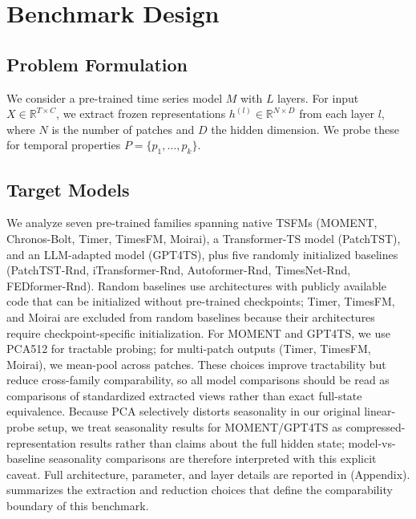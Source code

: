 \documentclass{article}
\begin{document}
\section{Benchmark Design}

\subsection{Problem Formulation}

We consider a pre-trained time series model $M$ with $L$ layers. For input $X \in \mathbb{R}^{T \times C}$, we extract frozen representations $h^{(l)} \in \mathbb{R}^{N \times D}$ from each layer $l$, where $N$ is the number of patches and $D$ the hidden dimension. We probe these for temporal properties $P = \{p_1, \dots, p_k\}$.

\subsection{Target Models}

We analyze seven pre-trained families spanning native TSFMs (MOMENT, Chronos-Bolt, Timer, TimesFM, Moirai), a Transformer-TS model (PatchTST), and an LLM-adapted model (GPT4TS), plus five randomly initialized baselines (PatchTST-Rnd, iTransformer-Rnd, Autoformer-Rnd, TimesNet-Rnd, FEDformer-Rnd). Random baselines use architectures with publicly available code that can be initialized without pre-trained checkpoints; Timer, TimesFM, and Moirai are excluded from random baselines because their architectures require checkpoint-specific initialization. For MOMENT and GPT4TS, we use PCA512 for tractable probing; for multi-patch outputs (Timer, TimesFM, Moirai), we mean-pool across patches. These choices improve tractability but reduce cross-family comparability, so all model comparisons should be read as comparisons of standardized extracted views rather than exact full-state equivalence. Because PCA selectively distorts seasonality in our original linear-probe setup, we treat seasonality results for MOMENT/GPT4TS as compressed-representation results rather than claims about the full hidden state; model-vs-baseline seasonality comparisons are therefore interpreted with this explicit caveat. Full architecture, parameter, and layer details are reported in  (Appendix).  summarizes the extraction and reduction choices that define the comparability boundary of this benchmark.
\end{document}
